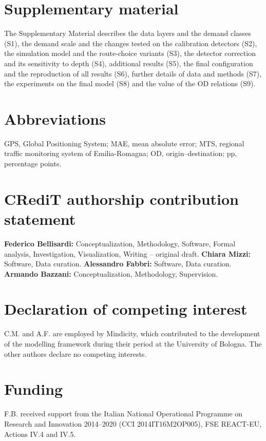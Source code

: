 \documentclass[preprint,11pt,a4paper]{elsarticle}
\begin{document}
\section*{Supplementary material}
The Supplementary Material describes the data layers and the demand classes (S1), the demand scale and the changes tested on the calibration detectors (S2), the simulation model and the route-choice variants (S3), the detector correction and its sensitivity to depth (S4), additional results (S5), the final configuration and the reproduction of all results (S6), further details of data and methods (S7), the experiments on the final model (S8) and the value of the OD relations (S9).

\section*{Abbreviations}
GPS, Global Positioning System; MAE, mean absolute error; MTS, regional traffic monitoring system of Emilia-Romagna; OD, origin--destination; pp, percentage points.

\section*{CRediT authorship contribution statement}
\textbf{Federico Bellisardi:} Conceptualization, Methodology, Software, Formal analysis, Investigation, Visualization, Writing -- original draft.
\textbf{Chiara Mizzi:} Software, Data curation.
\textbf{Alessandro Fabbri:} Software, Data curation.
\textbf{Armando Bazzani:} Conceptualization, Methodology, Supervision.

\section*{Declaration of competing interest}
C.M. and A.F. are employed by Mindicity, which contributed to the development of the modelling framework during their period at the University of Bologna. The other authors declare no competing interests.

\section*{Funding}
F.B. received support from the Italian National Operational Programme on Research and Innovation 2014--2020 (CCI 2014IT16M2OP005), FSE REACT-EU, Actions IV.4 and IV.5.
\end{document}
